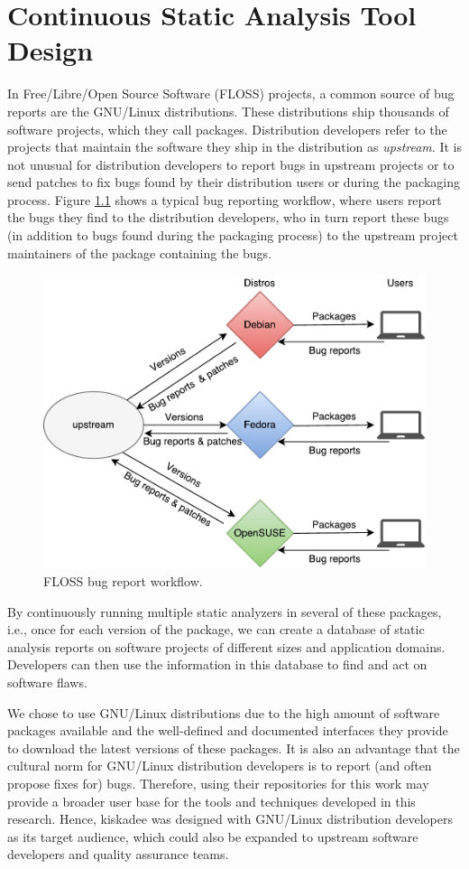 \chapter{Continuous Static Analysis Tool Design}
\label{ch:kiskadee}

In Free/Libre/Open Source Software (FLOSS) projects, a
common source of bug reports are the GNU/Linux distributions.
These distributions ship thousands of software projects, which
they call packages. Distribution developers refer to the
projects that maintain the software they ship in the
distribution as \textit{upstream}.  It is not unusual for
distribution developers to report bugs in upstream projects or
to send patches to fix bugs found by their distribution users
or during the packaging process. Figure
\ref{fig:floss_bugs_workflow} shows a typical bug reporting
workflow, where users report the bugs they find to the
distribution developers, who in turn report these bugs (in
addition to bugs found during the packaging process) to the
upstream project maintainers of the package containing the bugs.

\begin{figure}[!h]
  \centering
  \includegraphics[width=.75\textwidth]{figures/floss_bugs_workflow} 
  \caption{FLOSS bug report workflow.}
  \label{fig:floss_bugs_workflow} 
\end{figure}

By continuously running multiple static analyzers in several of these packages,
i.e., once for each version of the package, we can create a database of static
analysis reports on software projects of different sizes and application
domains. Developers can then use the information in this database to find and
act on software flaws.

We chose to use GNU/Linux distributions due to the high amount of software
packages available and the well-defined and documented interfaces they provide
to download the latest versions of these packages. It is also an advantage that
the cultural norm for GNU/Linux distribution developers is to report (and often
propose fixes for) bugs. Therefore, using their repositories for this work may
provide a broader user base for the tools and techniques developed in this
research. Hence, kiskadee was designed with GNU/Linux distribution developers
as its target audience, which could also be expanded to upstream software
developers and quality assurance teams.

